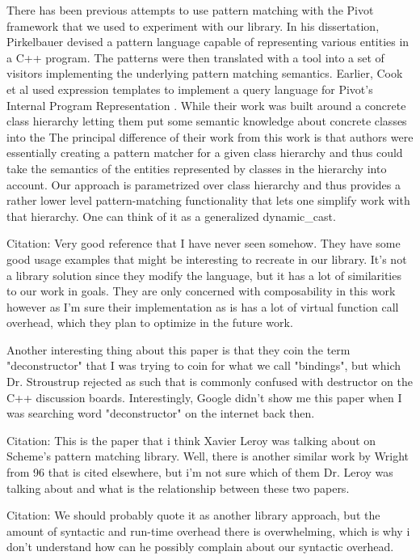 There has been previous attempts to use pattern matching with the Pivot 
framework that we used to experiment with our library. In his dissertation, 
Pirkelbauer devised a pattern language capable of representing various entities 
in a C++ program. The patterns were then translated with a tool into a set of 
visitors implementing the underlying pattern matching 
semantics\cite{PirkelbauerThesis}. Earlier, Cook et al used expression templates 
to implement a query language for Pivot's Internal Program Representation 
\cite{iql04}. While their work was built around a concrete class hierarchy 
letting them put some semantic knowledge about concrete classes into the 
The principal difference of their work from this work is that 
authors were essentially creating a pattern matcher for a given class hierarchy 
and thus could take the semantics of the entities represented by classes in the 
hierarchy into account. Our approach is parametrized over class hierarchy and 
thus provides a rather lower level pattern-matching functionality that lets one 
simplify work with that hierarchy.  One can think of it as a generalized 
dynamic\_cast.

Citation\cite{padl08}:
Very good reference that I have never seen somehow. They have some good usage 
examples that might be interesting to recreate in our library. It's not a 
library solution since they modify the language, but it has a lot of 
similarities to our work in goals. They are only concerned with composability in 
this work however as I'm sure their implementation as is has a lot of virtual 
function call overhead, which they plan to optimize in the future work.  

Another interesting thing about this paper is that they coin the term 
"deconstructor" that I was trying to coin for what we call "bindings", but which 
Dr. Stroustrup rejected as such that is commonly confused with destructor on the 
C++ discussion boards. Interestingly, Google didn't show me this paper when I 
was searching word "deconstructor" on the internet back then. 

Citation\cite{Tobin-Hochstadt_2010}:
This is the paper that i think Xavier Leroy was talking about on Scheme's 
pattern matching library. Well, there is another similar work by Wright from 96 
that is cited elsewhere, but i'm not sure which of them Dr. Leroy was talking 
about and what is the relationship between these two papers.

Citation\cite{Visser06matchingobjects}:
We should probably quote it as another library approach, but the amount of 
syntactic and run-time overhead there is overwhelming, which is why i don't 
understand how can he possibly complain about our syntactic overhead.

